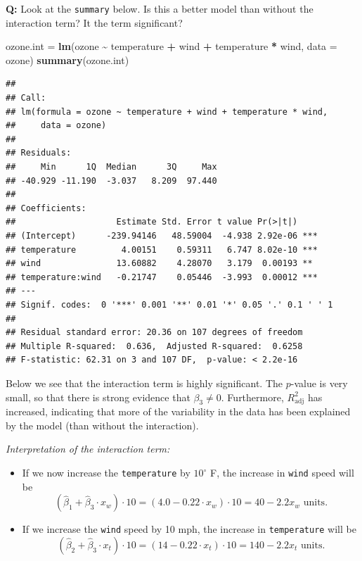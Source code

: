\documentclass[
]{article}
\newenvironment{Shaded}{\begin{snugshade}}{\end{snugshade}}
\newcommand{\AttributeTok}[1]{\textcolor[rgb]{0.13,0.29,0.53}{#1}}
\newcommand{\FunctionTok}[1]{\textcolor[rgb]{0.13,0.29,0.53}{\textbf{#1}}}
\newcommand{\NormalTok}[1]{#1}
\newcommand{\OtherTok}[1]{\textcolor[rgb]{0.56,0.35,0.01}{#1}}
\newcommand{\SpecialCharTok}[1]{\textcolor[rgb]{0.81,0.36,0.00}{\textbf{#1}}}
\begin{document}
\textbf{Q:} Look at the \texttt{summary} below. Is this a better model
than without the interaction term? It the term significant?

\footnotesize

\begin{Shaded}
\begin{Highlighting}[]
\NormalTok{ozone.int }\OtherTok{=} \FunctionTok{lm}\NormalTok{(ozone }\SpecialCharTok{\textasciitilde{}}\NormalTok{ temperature }\SpecialCharTok{+}\NormalTok{ wind }\SpecialCharTok{+}\NormalTok{ temperature }\SpecialCharTok{*}\NormalTok{ wind, }\AttributeTok{data =}\NormalTok{ ozone)}
\FunctionTok{summary}\NormalTok{(ozone.int)}
\end{Highlighting}
\end{Shaded}

\begin{verbatim}
## 
## Call:
## lm(formula = ozone ~ temperature + wind + temperature * wind, 
##     data = ozone)
## 
## Residuals:
##     Min      1Q  Median      3Q     Max 
## -40.929 -11.190  -3.037   8.209  97.440 
## 
## Coefficients:
##                    Estimate Std. Error t value Pr(>|t|)    
## (Intercept)      -239.94146   48.59004  -4.938 2.92e-06 ***
## temperature         4.00151    0.59311   6.747 8.02e-10 ***
## wind               13.60882    4.28070   3.179  0.00193 ** 
## temperature:wind   -0.21747    0.05446  -3.993  0.00012 ***
## ---
## Signif. codes:  0 '***' 0.001 '**' 0.01 '*' 0.05 '.' 0.1 ' ' 1
## 
## Residual standard error: 20.36 on 107 degrees of freedom
## Multiple R-squared:  0.636,  Adjusted R-squared:  0.6258 
## F-statistic: 62.31 on 3 and 107 DF,  p-value: < 2.2e-16
\end{verbatim}

\normalsize

Below we see that the interaction term is highly significant. The
\(p\)-value is very small, so that there is strong evidence that
\(\beta_3 \neq 0\). Furthermore, \(R^2_{\text{adj}}\) has increased,
indicating that more of the variability in the data has been explained
by the model (than without the interaction).

\emph{Interpretation of the interaction term:}

\begin{itemize}
\item
  If we now increase the \texttt{temperature} by \(10^{\circ}\) F, the
  increase in \texttt{wind} speed will be
  \[(\hat \beta_1+\hat \beta_3 \cdot x_w) \cdot 10 = (4.0 -0.22 \cdot x_w) \cdot 10 = 40-2.2 x_w \text{ units}.\]
\item
  If we increase the \texttt{wind} speed by 10 mph, the increase in
  \texttt{temperature} will be
  \[(\hat \beta_2 + \hat \beta_3 \cdot x_t) \cdot 10 = (14 -0.22 \cdot x_t) \cdot 10 = 140-2.2 x_t \text{ units}.\]
\end{itemize}
\end{document}
